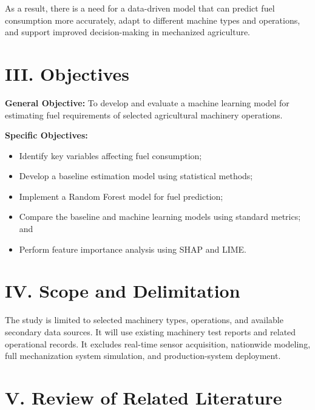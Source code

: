 \documentclass[11pt,twocolumn]{article}
\begin{document}
\vspace{10pt}

As a result, there is a need for a data-driven model that can predict fuel consumption more accurately, adapt to different machine types and operations, and support improved decision-making in mechanized agriculture.

\section*{III. Objectives}

\vspace{10pt}

\textbf{General Objective:} To develop and evaluate a machine learning model for estimating fuel requirements of selected agricultural machinery operations.

\vspace{10pt}

\textbf{Specific Objectives:}
\begin{itemize}
\item Identify key variables affecting fuel consumption;
\item Develop a baseline estimation model using statistical methods;
\item Implement a Random Forest model for fuel prediction;
\item Compare the baseline and machine learning models using standard metrics; and
\item Perform feature importance analysis using SHAP and LIME.
\end{itemize}

\section*{IV. Scope and Delimitation}

\vspace{10pt}

The study is limited to selected machinery types, operations, and available secondary data sources. It will use existing machinery test reports and related operational records. It excludes real-time sensor acquisition, nationwide modeling, full mechanization system simulation, and production-system deployment.

\section*{V. Review of Related Literature}
\end{document}
